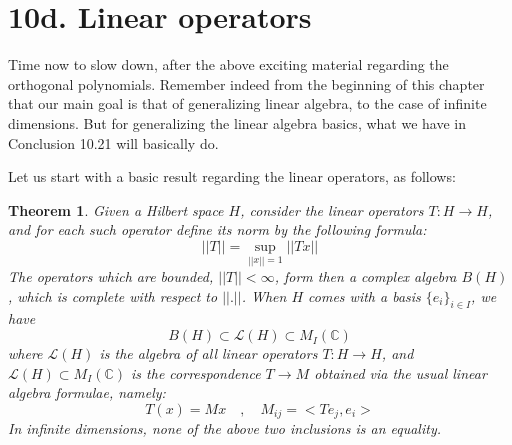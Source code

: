\documentclass[12pt]{amsbook}
\newtheorem{theorem}{Theorem}[chapter]
\begin{document}
\section*{10d. Linear operators} 

Time now to slow down, after the above exciting material regarding the orthogonal polynomials. Remember indeed from the beginning of this chapter that our main goal is that of generalizing linear algebra, to the case of infinite dimensions. But for generalizing the linear algebra basics, what we have in Conclusion 10.21 will basically do.

\bigskip

Let us start with a basic result regarding the linear operators, as follows:


\begin{theorem}
Given a Hilbert space $H$, consider the linear operators $T:H\to H$, and for each such operator define its norm by the following formula:
$$||T||=\sup_{||x||=1}||Tx||$$
The operators which are bounded, $||T||<\infty$, form then a complex algebra $B(H)$, which is complete with respect to $||.||$. When $H$ comes with a basis $\{e_i\}_{i\in I}$, we have
$$B(H)\subset\mathcal L(H)\subset M_I(\mathbb C)$$
where $\mathcal L(H)$ is the algebra of all linear operators $T:H\to H$, and $\mathcal L(H)\subset M_I(\mathbb C)$ is the correspondence $T\to M$ obtained via the usual linear algebra formulae, namely:
$$T(x)=Mx\quad,\quad M_{ij}=<Te_j,e_i>$$
In infinite dimensions, none of the above two inclusions is an equality.
\end{theorem}
\end{document}
